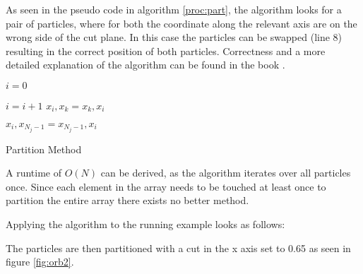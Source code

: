 \documentclass[]{article}
\begin{document}
As seen in the pseudo code in algorithm \ref{proc:part}, the algorithm looks for a pair of particles, where for both the coordinate along the relevant axis are  on the wrong side of the cut plane. In this case the particles can be swapped (line 8) resulting in the correct position of both particles. Correctness and a more detailed explanation of the algorithm can be found in the book \cite{algorithms}.

\algnewcommand{}


\begin{algorithm}[H]
	\begin{algorithmic}[1]
		\State $i = 0$
		
			\State $i = i + 1$
		\EndWhile
		\State $x_{i}, x_{k} = x_{k}, x_{i}$
		\EndIf
		\EndFor
		
		\State $ x_{i}, x_{N_j-1} = x_{N_j-1}, x_{i}$
		\EndProcedure
	\end{algorithmic}
\caption{Partition Method}
\label{proc:part}
\end{algorithm}

A runtime of $O(N)$ can be derived, as the algorithm iterates over all particles once. Since each element in the array needs to be touched at least once to partition the entire array there exists no better method.

Applying the algorithm to the running example looks as follows:

\begin{figure}[H]
	\begin{center}
	\end{center}
\end{figure}

The particles are then partitioned with a cut in the x axis set to 0.65 as seen in figure \ref{fig:orb2}.

\begin{figure}[H]
	\begin{center}
	\end{center}
\end{figure}
\end{document}
